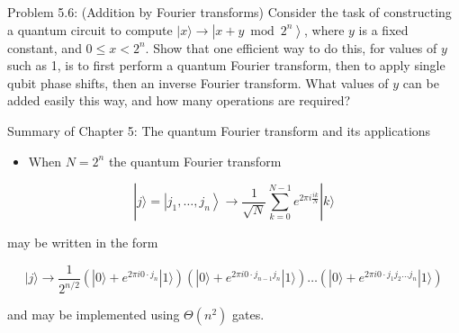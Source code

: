 Problem 5.6: (Addition by Fourier transforms) Consider the task of constructing a quantum circuit to compute $|x\rangle \rightarrow\left|x+y \bmod 2^{n}\right\rangle$, where $y$ is a fixed constant, and $0 \leq x<2^{n}$. Show that one efficient way to do this, for values of $y$ such as 1, is to first perform a quantum Fourier transform, then to apply single qubit phase shifts, then an inverse Fourier transform. What values of $y$ can be added easily this way, and how many operations are required?

Summary of Chapter 5: The quantum Fourier transform and its applications

\begin{itemize}
  \item When $N=2^{n}$ the quantum Fourier transform
\end{itemize}

\begin{equation*}
|j\rangle=\left|j_{1}, \ldots, j_{n}\right\rangle \longrightarrow \frac{1}{\sqrt{N}} \sum_{k=0}^{N-1} e^{2 \pi i \frac{i k}{N}}|k\rangle \tag{5.81}
\end{equation*}

may be written in the form

\begin{equation*}
|j\rangle \rightarrow \frac{1}{2^{n / 2}}\left(|0\rangle+e^{2 \pi i 0 \cdot j_{n}}|1\rangle\right)\left(|0\rangle+e^{2 \pi i 0 \cdot j_{n-1} j_{n}}|1\rangle\right) \ldots\left(|0\rangle+e^{2 \pi i 0 \cdot j_{1} j_{2} \ldots j_{n}}|1\rangle\right) \tag{5.82}
\end{equation*}

and may be implemented using $\Theta\left(n^{2}\right)$ gates.

